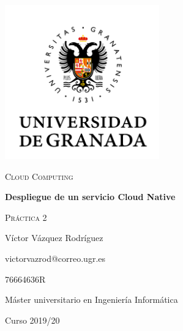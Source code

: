 \documentclass{article}
\begin{document}
\begin{titlepage}
    \centering
    \includegraphics[width=0.5\textwidth]{images/logo-ugr.png}\par
    \vspace{1cm}
    {\Large\scshape Cloud Computing \par}
    {\huge\bfseries Despliegue de un servicio Cloud Native \par}
    \vspace{0.2cm}
    {\scshape Práctica 2 \par}
    \vfill
    {\large Víctor Vázquez Rodríguez  \par}
    {victorvazrod@correo.ugr.es \par}
    {76664636R \par}
    \vfill
    {\large Máster universitario en Ingeniería Informática \par}
    \vspace{0.2cm}
    {Curso 2019/20 \par}
\end{titlepage}

\tableofcontents\newpage

\newpage
\newpage
\newpage
\newpage
\newpage
\end{document}
